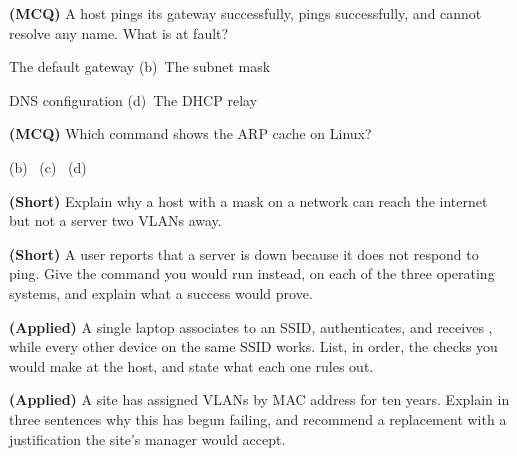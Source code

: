 \begin{reviewq}
  \item \textbf{(MCQ)} A host pings its gateway successfully, pings 
        successfully, and cannot resolve any name. What is at fault?
        \begin{tight}
          \item[(a)] The default gateway \quad (b)~The subnet mask
          \item[(c)] DNS configuration \quad (d)~The DHCP relay
        \end{tight}
  \item \textbf{(MCQ)} Which command shows the ARP cache on Linux?
        \begin{tight}
          \item[(a)]  \quad (b)~
          \quad (c)~ \quad (d)~
        \end{tight}
  \item \textbf{(Short)} Explain why a host with a  mask on a 
        network can reach the internet but not a server two VLANs away.
  \item \textbf{(Short)} A user reports that a server is down because it does not
        respond to ping. Give the command you would run instead, on each of the
        three operating systems, and explain what a success would prove.
  \item \textbf{(Applied)} A single laptop associates to an SSID, authenticates,
        and receives , while every other device on the same SSID
        works. List, in order, the checks you would make at the host, and state
        what each one rules out.
  \item \textbf{(Applied)} A site has assigned VLANs by MAC address for ten
        years. Explain in three sentences why this has begun failing, and
        recommend a replacement with a justification the site's manager would
        accept.
\end{reviewq}
